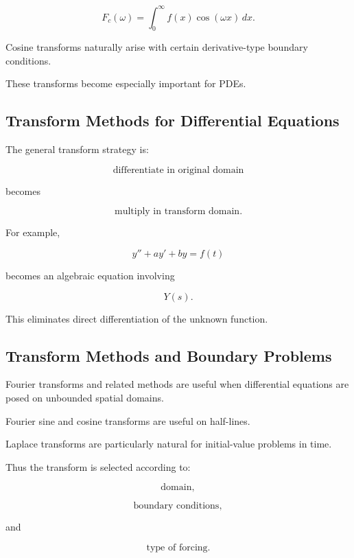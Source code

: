 \[
\boxed{
F_c(\omega)
=
\int_0^\infty
f(x)
\cos(\omega x)
\,dx.
}
\]

Cosine transforms naturally arise with certain derivative-type boundary
conditions.

These transforms become especially important for PDEs.

\subsection{Transform Methods for Differential Equations}
\label{subsec:transform-differential-equations}

The general transform strategy is:

\[
\boxed{
\text{differentiate in original domain}
}
\]

becomes

\[
\boxed{
\text{multiply in transform domain}.
}
\]

For example,

\[
y''+ay'+by=f(t)
\]

becomes an algebraic equation involving

\[
Y(s).
\]

This eliminates direct differentiation of the unknown function.

\subsection{Transform Methods and Boundary Problems}
\label{subsec:transform-boundary-problems}

Fourier transforms and related methods are useful when differential
equations are posed on unbounded spatial domains.

Fourier sine and cosine transforms are useful on half-lines.

Laplace transforms are particularly natural for initial-value problems in
time.

Thus the transform is selected according to:

\[
\boxed{
\text{domain},
}
\]

\[
\boxed{
\text{boundary conditions},
}
\]

and

\[
\boxed{
\text{type of forcing}.
}
\]

